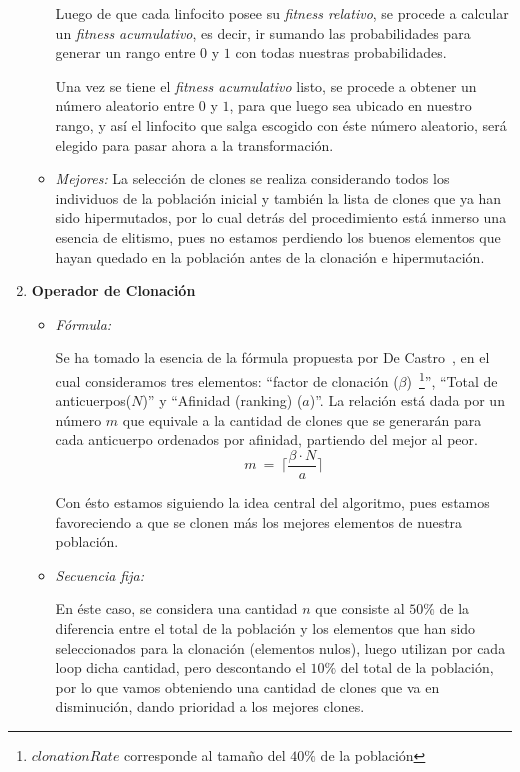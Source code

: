 \begin{enumerate}
\begin{itemize}
				Luego de que cada linfocito posee su \emph{fitness relativo}, se procede a calcular un \emph{fitness acumulativo},
				es decir, ir sumando las probabilidades para generar un rango entre $0$ y $1$ con todas nuestras probabilidades.
					
				Una vez se tiene el \emph{fitness acumulativo} listo, se procede a obtener un número aleatorio entre $0$ y $1$,
				para que luego sea ubicado en nuestro rango, y así el linfocito que salga escogido con éste número aleatorio, será
				elegido para pasar ahora a la transformación.
		
			\item \emph{Mejores:}
				La selección de clones se realiza considerando todos los individuos de la población inicial y también
				la lista de clones que ya han sido hipermutados, por lo cual detrás del procedimiento está inmerso una
				esencia de elitismo, pues no estamos perdiendo los buenos elementos que hayan quedado en la población
				antes de la clonación e hipermutación.

		\end{itemize}
	\item \textbf{Operador de Clonación}
		\begin{itemize}
			\item \emph{Fórmula:}

				Se ha tomado la esencia de la fórmula propuesta por De Castro~\cite{decastro},
				en el cual consideramos tres elementos: ``factor de clonación ($\beta$)~\footnote{$clonationRate$
				corresponde al tamaño del $40\%$ de la población}'', ``Total de anticuerpos($N$)'' y
				``Afinidad (ranking) ($a$)''.
				La relación está dada por un número $m$ que equivale a la cantidad de clones que se generarán
				para cada anticuerpo ordenados por afinidad, partiendo del mejor al peor.
				$$m\ =\ \lceil\frac{\beta \cdot N}{a}\rceil$$

				Con ésto estamos siguiendo la idea central del algoritmo, pues estamos favoreciendo a que se clonen más
				los mejores elementos de nuestra población.
				
			\item \emph{Secuencia fija:}
			
				En éste caso, se considera una cantidad $n$ que consiste al $50\%$ de la diferencia entre el total de la población
				y los elementos que han sido seleccionados para la clonación (elementos nulos), luego utilizan por cada loop
				dicha cantidad, pero descontando el $10\%$ del total de la población, por lo que vamos obteniendo una cantidad
				de clones que va en disminución, dando prioridad a los mejores clones.
			

\end{itemize}
\end{enumerate}
